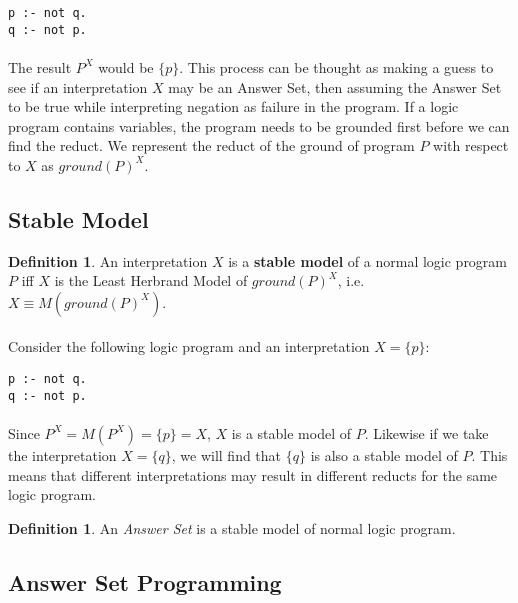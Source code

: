 \documentclass{article}
\theoremstyle{plain}
\theoremstyle{definition}
\newtheorem{defn}[thm]{Definition} %
\begin{document}
\begin{multicols}{2}
\begin{lstlisting}
p :- not q.
q :- not p.
\end{lstlisting}

\paragraph{} The result $P^X$ would be $\{p\}$. This process can be thought as making a guess to see if an interpretation $X$ may be an Answer Set, then assuming the Answer Set to be true while interpreting negation as failure in the program. If a logic program contains variables, the program needs to be grounded first before we can find the reduct. We represent the reduct of the ground of program $P$ with respect to $X$ as $ground(P)^X$.

\subsection{Stable Model}

\begin{defn}An interpretation $X$ is a \textbf{stable model} of a normal logic program $P$ iff $X$ is the Least Herbrand Model of $ground(P)^X$, i.e. $X \equiv M(ground(P)^X)$.\end{defn}

\paragraph{} Consider the following logic program and an interpretation $X = \{p\}$:

\begin{lstlisting}
p :- not q.
q :- not p.
\end{lstlisting}

\paragraph{} Since $P^X = M(P^X) = \{p\} = X$, $X$ is a stable model of $P$. Likewise if we take the interpretation $X = \{q\}$, we will find that $\{q\}$ is also a stable model of $P$. This means that different interpretations may result in different reducts for the same logic program.

\begin{defn}An \textit{Answer Set} is a stable model of normal logic program.\end{defn}

\subsection{Answer Set Programming}


\end{multicols}
\end{document}
